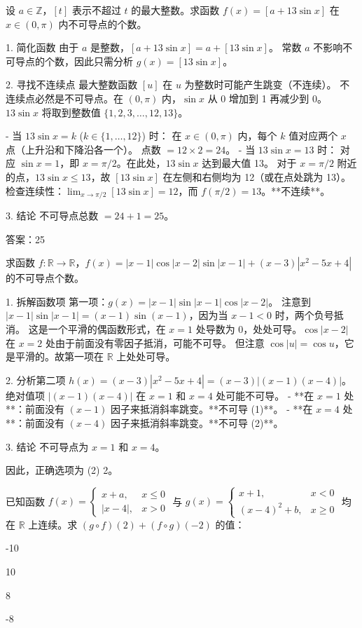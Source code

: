 \begin{questions}
\question 
设 $a \in \mathbb{Z}$，$[t]$ 表示不超过 $t$ 的最大整数。求函数 $f(x) = [a + 13 \sin x]$ 在 $x \in (0, \pi)$ 内不可导点的个数。

\begin{solution}
1. 简化函数
由于 $a$ 是整数，$[a + 13 \sin x] = a + [13 \sin x]$。
常数 $a$ 不影响不可导点的个数，因此只需分析 $g(x) = [13 \sin x]$。

2. 寻找不连续点
最大整数函数 $[u]$ 在 $u$ 为整数时可能产生跳变（不连续）。
不连续点必然是不可导点。在 $(0, \pi)$ 内，$\sin x$ 从 0 增加到 1 再减少到 0。
$13 \sin x$ 将取到整数值 $\{1, 2, 3, \dots, 12, 13\}$。

- 当 $13 \sin x = k$ ($k \in \{1, \dots, 12\}$) 时：
  在 $x \in (0, \pi)$ 内，每个 $k$ 值对应两个 $x$ 点（上升沿和下降沿各一个）。
  点数 $= 12 \times 2 = 24$。
- 当 $13 \sin x = 13$ 时：
  对应 $\sin x = 1$，即 $x = \pi/2$。在此处，$13 \sin x$ 达到最大值 13。
  对于 $x = \pi/2$ 附近的点，$13 \sin x \leq 13$，故 $[13 \sin x]$ 在左侧和右侧均为 12（或在点处跳为 13）。
  检查连续性：$\lim_{x \to \pi/2} [13 \sin x] = 12$，而 $f(\pi/2) = 13$。**不连续**。

3. 结论
不可导点总数 $= 24 + 1 = 25$。

答案：25
\end{solution}

\question 
求函数 $f : \mathbb{R} \to \mathbb{R}$，$f(x) = |x - 1|\cos|x - 2|\sin|x - 1| + (x - 3)|x^2 - 5x + 4|$ 的不可导点个数。

\begin{solution}
1. 拆解函数项
第一项：$g(x) = |x - 1|\sin|x - 1|\cos|x - 2|$。
注意到 $|x-1|\sin|x-1| = (x-1)\sin(x-1)$，因为当 $x-1 < 0$ 时，两个负号抵消。
这是一个平滑的偶函数形式，在 $x=1$ 处导数为 0，处处可导。$\cos|x-2|$ 在 $x=2$ 处由于前面没有零因子抵消，可能不可导。
但注意 $\cos|u| = \cos u$，它是平滑的。故第一项在 $\mathbb{R}$ 上处处可导。

2. 分析第二项
$h(x) = (x - 3)|x^2 - 5x + 4| = (x - 3)|(x - 1)(x - 4)|$。
绝对值项 $|(x - 1)(x - 4)|$ 在 $x=1$ 和 $x=4$ 处可能不可导。
- **在 $x=1$ 处**：前面没有 $(x-1)$ 因子来抵消斜率跳变。**不可导 (1)**。
- **在 $x=4$ 处**：前面没有 $(x-4)$ 因子来抵消斜率跳变。**不可导 (2)**。

3. 结论
不可导点为 $x=1$ 和 $x=4$。

因此，正确选项为 (2) 2。
\end{solution}

\question 
已知函数 $f(x) = \begin{cases} x + a, & x \leq 0 \\ |x - 4|, & x > 0 \end{cases}$ 与 $g(x) = \begin{cases} x + 1, & x < 0 \\ (x - 4)^2 + b, & x \geq 0 \end{cases}$ 均在 $\mathbb{R}$ 上连续。求 $(g \circ f)(2) + (f \circ g)(-2)$ 的值：
\begin{choices}
    \item -10
    \item 10
    \item 8
    \item -8
\end{choices}


\end{questions}
